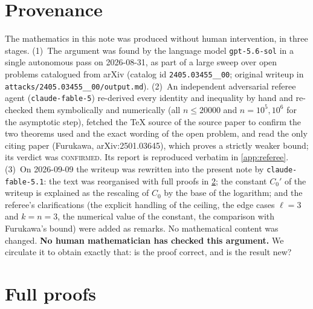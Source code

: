 \documentclass[11pt,a4paper]{article}
\theoremstyle{plain}
\theoremstyle{definition}
\theoremstyle{remark}
\begin{document}
\section{Provenance}\label{sec:provenance}

The mathematics in this note was produced without human intervention, in three stages.
(1)~The argument was found by the language model \texttt{gpt-5.6-sol} in a single autonomous pass on 2026-08-31, as part of a large sweep over open problems catalogued from arXiv (catalog id \texttt{2405.03455\_\_00}; original writeup in \texttt{attacks/2405.03455\_\_00/output.md}).
(2)~An independent adversarial referee agent (\texttt{claude-fable-5}) re-derived every identity and inequality by hand and re-checked them symbolically and numerically (all $n\le 20000$ and $n=10^5,10^6$ for the asymptotic step), fetched the TeX source of the source paper to confirm the two theorems used and the exact wording of the open problem, and read the only citing paper (Furukawa, arXiv:2501.03645), which proves a strictly weaker bound; its verdict was \textsc{confirmed}. Its report is reproduced verbatim in \cref{app:referee}.
(3)~On 2026-09-09 the writeup was rewritten into the present note by \texttt{claude-fable-5.1}: the text was reorganised with full proofs in \cref{app:proofs}; the constant $C_0'$ of the writeup is explained as the rescaling of $C_0$ by the base of the logarithm; and the referee's clarifications (the explicit handling of the ceiling, the edge cases $\ell=3$ and $k=n=3$, the numerical value of the constant, the comparison with Furukawa's bound) were added as remarks. No mathematical content was changed.
\textbf{No human mathematician has checked this argument.} We circulate it to obtain exactly that: is the proof correct, and is the result new?


\appendix

\section{Full proofs}\label{app:proofs}
\end{document}
